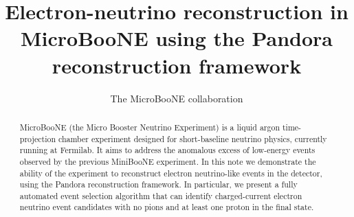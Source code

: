 \documentclass[a4paper]{article}
\title{Electron-neutrino reconstruction in MicroBooNE using the Pandora reconstruction framework}
\author{The MicroBooNE collaboration}
\begin{document}
\maketitle
\tableofcontents

\listoftodos

\begin{abstract}
MicroBooNE (the Micro Booster Neutrino Experiment) is a liquid argon
time-projection chamber experiment designed for short-baseline neutrino physics, currently running at Fermilab. It aims to address the anomalous excess of low-energy events observed by the previous MiniBooNE experiment. In this note we demonstrate the ability of the experiment to reconstruct electron neutrino-like events in the detector, using the Pandora reconstruction framework. In particular, we present a fully automated event selection algorithm that can identify charged-current electron neutrino event candidates with no pions and at least one proton in the final state.
\end{abstract}










\newpage
\end{document}
